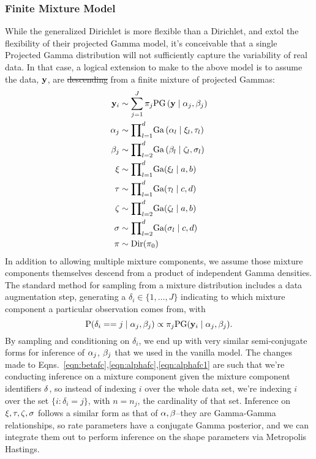 \subsubsection{Finite Mixture Model}
While the generalized Dirichlet is more flexible than a Dirichlet, and \cite{nunez2019}
  extol the flexibility of their projected Gamma model, it's conceivable that a single Projected Gamma
  distribution will not sufficiently capture the variability of real data.  In that case, a logical
  extension to make to the above model is to assume the data, ${\bf y}$, are \st{descending}  from a finite
  mixture of projected Gammas:
  \begin{equation}
    \label{eqn:fmixp}
    \begin{aligned}
      {\bf y}_i &\sim \sum_{j = 1}^J\pi_j\text{PG}\left({\bf y}\mid {\bf \alpha}_j, {\bf \beta}_j\right)\\
      {\bf \alpha}_j &\sim {\small \prod}_{l = 1}^d \text{Ga}\left(\alpha_l\mid\xi_l,\tau_l\right)\\
      {\bf \beta}_j &\sim {\small \prod}_{l = 2}^d \text{Ga}\left(\beta_l\mid\zeta_l,\sigma_l\right)\\
      {\bf \xi} &\sim {\small \prod}_{l = 1}^d \text{Ga}(\xi_l\mid a,b)\\
      {\bf \tau} &\sim {\small \prod}_{l = 1}^d \text{Ga}(\tau_l\mid c,d)\\
      {\bf \zeta} &\sim {\small\prod}_{l = 2}^d\text{Ga}(\zeta_l \mid a,b)\\
      {\bf \sigma} &\sim {\small\prod}_{l = 2}^d\text{Ga}(\sigma_l\mid c,d)\\
      {\bf \pi} &\sim \text{Dir}(\pi_0)
    \end{aligned}
  \end{equation}
  In addition to allowing multiple mixture components, we assume those mixture components themselves
  descend from a product of independent Gamma densities. The standard method for sampling from a
  mixture distribution includes a data augmentation step, generating a
  $\delta_i \in \lbrace 1,\ldots, J\rbrace$ indicating to which mixture component a
  particular observation comes from, with
  \begin{equation*}
    \text{P}(\delta_i == j\mid\alpha_j,\beta_j) \propto \pi_j\text{PG}({\bf y}_i\mid {\bf \alpha}_j,{\bf \beta}_j).
  \end{equation*}
  By sampling and conditioning on $\delta_i$, we end up with very similar semi-conjugate forms for
  inference of ${\bf \alpha}_j$, ${\bf \beta}_j$ that we used in the vanilla model.  The changes made
  to Eqns.~\ref{eqn:betafc},\ref{eqn:alphafc},\ref{eqn:alphafc1} are such that we're conducting inference
  on a mixture component given the mixture component identifiers ${\bf \delta}$, so instead of indexing
  $i$ over the whole data set, we're indexing $i$ over the set $\{i :\delta_i = j\}$, with $n = n_j$,
  the cardinality of that set. Inference on ${\bf \xi,\tau,\zeta,\sigma}$ follows a similar form as
  that of ${\bf \alpha,\beta}$--they are Gamma-Gamma relationships, so rate parameters have a conjugate
  Gamma posterior, and we can integrate them out to perform inference on the shape parameters via
  Metropolis Hastings.

